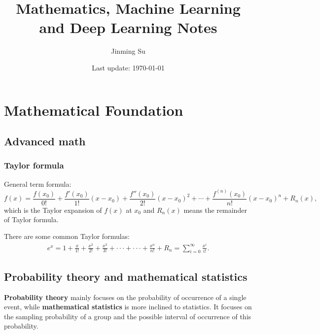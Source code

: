 \documentclass[10pt,onecolumn]{book}
\begin{document}
\date{}

\title{\textbf{Mathematics, Machine Learning and Deep Learning Notes}}

\author{Jinming Su}
\date{Last update: \today}

\maketitle

\thispagestyle{empty}
\newpage
{}
\newpage
\tableofcontents
\newpage
\listoftodos

\newpage
{}
\mainmatter

\chapter{Mathematical Foundation}
\section{Advanced math}
\subsection{Taylor formula}
General term formula:
\begin{equation}
f(x) = \frac{f(x_0)}{0!} + \frac{f'(x_0)}{1!}(x - x_0) + \frac{f''(x_0)}{2!}(x - x_0)^2 + \cdots + \frac{f^{(n)}(x_0)}{n!}(x - x_0)^n + R_n(x),
\end{equation}
which is the Taylor expansion of $f(x)$ at $x_0$ and $R_n(x)$ means the remainder of Taylor formula.

There are some common Taylor formulas:
\begin{equation}
\begin{split}
e^x = 1 + \frac{x}{1!} + \frac{x^2}{2!} + \frac{x^3}{3!} + \cdot \cdot \cdot + \cdot \cdot \cdot + \frac{x^n}{n!} + R_n = \sum_{i=0}^{\infty} \frac{x^i}{i!}.
\end{split}
\end{equation}

\section{Probability theory and mathematical statistics}
\textbf{Probability theory} mainly focuses on the probability of occurrence of a single event, while \textbf{mathematical statistics} is more inclined to statistics. It focuses on the sampling probability of a group and the possible interval of occurrence of this probability.
\end{document}
